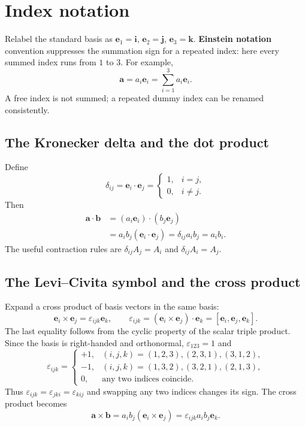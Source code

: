 \section{Index notation}

Relabel the standard basis as
$\mathbf e_1=\mathbf i$, $\mathbf e_2=\mathbf j$, $\mathbf e_3=\mathbf k$.
\textbf{Einstein notation} convention suppresses the summation sign for a repeated
index: here every summed index runs from $1$ to $3$. For example,
\[
 \mathbf a=a_i\mathbf e_i
 =\sum_{i=1}^3a_i\mathbf e_i.
\]
A free index is not summed; a repeated dummy index can be renamed consistently.

\subsection{The Kronecker delta and the dot product}
Define
\[
 \delta_{ij}=\mathbf e_i\cdot\mathbf e_j
 =\begin{cases}1,&i=j,\\0,&i\ne j.\end{cases}
\]
Then
\begin{align*}
 \mathbf a\cdot\mathbf b
 &=(a_i\mathbf e_i)\cdot(b_j\mathbf e_j)\\
 &=a_i b_j(\mathbf e_i\cdot\mathbf e_j)
 =\delta_{ij}a_i b_j=a_i b_i.
\end{align*}
The useful contraction rules are
$\delta_{ij}A_j=A_i$ and $\delta_{ij}A_i=A_j$.

\subsection{The Levi--Civita symbol and the cross product}
Expand a cross product of basis vectors in the same basis:
\[
 \mathbf e_i\times\mathbf e_j=\varepsilon_{ijk}\mathbf e_k,
 \qquad
 \varepsilon_{ijk}=(\mathbf e_i\times\mathbf e_j)\cdot\mathbf e_k
 =[\mathbf e_i,\mathbf e_j,\mathbf e_k].
\]
The last equality follows from the cyclic property of the scalar triple product.
Since the basis is right-handed and orthonormal, $\varepsilon_{123}=1$ and
\[
 \varepsilon_{ijk}=
 \begin{cases}
 +1,&(i,j,k)=(1,2,3),(2,3,1),(3,1,2),\\
 -1,&(i,j,k)=(1,3,2),(3,2,1),(2,1,3),\\
 0,&\text{any two indices coincide}.
 \end{cases}
\]
Thus $\varepsilon_{ijk}=\varepsilon_{jki}=\varepsilon_{kij}$ and swapping
any two indices changes its sign. The cross product becomes
\[
 \boxed{\mathbf a\times\mathbf b
 =a_i b_j(\mathbf e_i\times\mathbf e_j)
 =\varepsilon_{ijk}a_i b_j\mathbf e_k}.
\]

